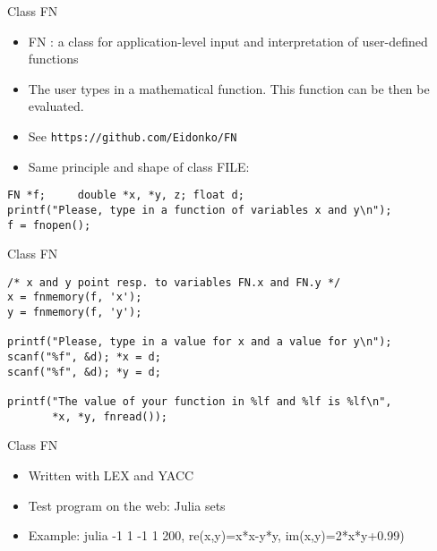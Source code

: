 \begin{frame}[fragile]{Class FN}
\begin{itemize}
\item FN : a class for application-level input and interpretation of user-defined
      functions
\item The user types in a mathematical function. This function can be then be evaluated.
\item See \verb"https://github.com/Eidonko/FN"
\item Same principle and shape of class FILE:
\end{itemize}

\vspace{20pt}

\begin{verbatim}
FN *f;     double *x, *y, z; float d;
printf("Please, type in a function of variables x and y\n");
f = fnopen();
\end{verbatim}


\end{frame}
\begin{frame}[fragile]{Class FN}
\begin{verbatim}
/* x and y point resp. to variables FN.x and FN.y */
x = fnmemory(f, 'x');
y = fnmemory(f, 'y');

printf("Please, type in a value for x and a value for y\n");
scanf("%f", &d); *x = d;
scanf("%f", &d); *y = d;

printf("The value of your function in %lf and %lf is %lf\n",
       *x, *y, fnread());
\end{verbatim}



\end{frame}
\begin{frame}[fragile]{Class FN}
\begin{itemize}
\item Written with LEX and YACC
\item Test program on the web: Julia sets
\item Example: julia -1 1 -1 1 200, re(x,y)=x*x-y*y, im(x,y)=2*x*y+0.99) 
\end{itemize}
\end{frame}
